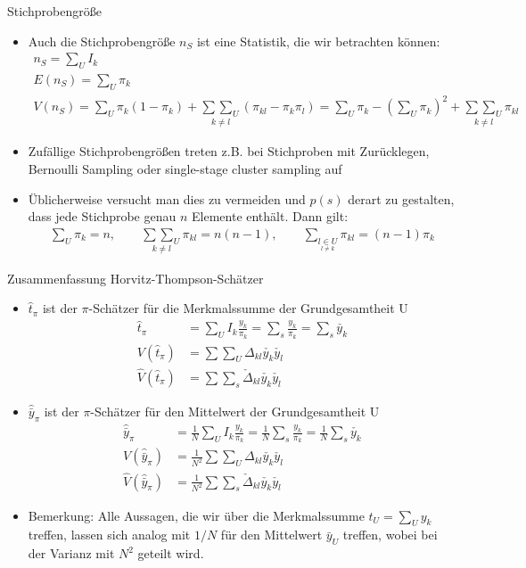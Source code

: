 \documentclass[9pt]{beamer}
\begin{document}
\begin{frame}{Stichprobengröße}
\begin{itemize}
	\item Auch die Stichprobengröße $n_S$ ist eine Statistik, die wir betrachten können:\small
	\begin{gather*}
	n_S = \sum_U I_k\\
	E(n_S) = \sum_U \pi_k\\
	V(n_S) = \sum_U \pi_k(1-\pi_k) + \underset{k\neq l}{\sum\sum_U} (\pi_{kl}-\pi_k \pi_l) 
	= \sum_U\pi_k -\left(\sum_U \pi_k\right)^2 + \underset{k\neq l}{\sum\sum_U} \pi_{kl}
	\end{gather*} \normalsize
	\item Zufällige Stichprobengrößen treten z.B. bei Stichproben mit Zurücklegen, Bernoulli Sampling oder single-stage cluster sampling auf
	\item Üblicherweise versucht man dies zu vermeiden und $p(s)$ derart zu gestalten, dass jede Stichprobe genau $n$ Elemente enthält. Dann gilt:
	\begin{align*}
	\sum_U \pi_k = n, \qquad \underset{k\neq l}{\sum\sum_U}\pi_{kl}=n(n-1), \qquad \sum_{\underset{l\neq k}{l \in U}} \pi_{kl} = (n-1)\pi_k
	\end{align*}
\end{itemize}
\end{frame}

\begin{frame}{Zusammenfassung Horvitz-Thompson-Schätzer}
\begin{itemize}
	\item $\hat{t}_\pi$ ist der $\pi$-Schätzer für die Merkmalssumme der Grundgesamtheit U
	\begin{align*}
	\hat{t}_\pi &= \sum_U I_k \frac{y_k}{\pi_k}=\sum_s \frac{y_k}{\pi_k} = \sum_s \check{y_k}\\
	V(\hat{t}_\pi) &= \sum\sum_U \Delta_{kl}\check{y_k}\check{y_l}\\
	\hat{V}(\hat{t}_\pi) &= \sum\sum_s \check{\Delta}_{kl}\check{y_k}\check{y_l}
	\end{align*}
	\item $\hat{\bar{y}}_\pi$ ist der $\pi$-Schätzer für den Mittelwert der Grundgesamtheit U
	\begin{align*}
	\hat{\bar{y}}_\pi &= \frac{1}{N}\sum_U I_k \frac{y_k}{\pi_k}=\frac{1}{N}\sum_s \frac{y_k}{\pi_k} = \frac{1}{N}\sum_s \check{y_k}\\
	V(\hat{\bar{y}}_\pi) &= \frac{1}{N^2}\sum\sum_U \Delta_{kl}\check{y_k}\check{y_l}\\
	\hat{V}(\hat{\bar{y}}_\pi) &= \frac{1}{N^2}\sum\sum_s \check{\Delta}_{kl}\check{y_k}\check{y_l}
	\end{align*} 
	\item Bemerkung: Alle Aussagen, die wir über die Merkmalssumme $t_U=\sum_U y_k$ treffen, lassen sich analog mit $1/N$ für den Mittelwert $\bar{y}_U$ treffen, wobei bei der Varianz mit $N^2$ geteilt wird.
\end{itemize}
\end{frame}
\end{document}

